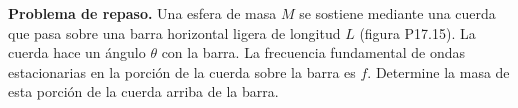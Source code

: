 \item \textbf{Problema de repaso.}
Una esfera de masa $M$ se sostiene mediante una cuerda que pasa sobre una barra horizontal ligera de longitud $L$ (figura P17.15). La cuerda hace un ángulo $\theta$ con la barra. La frecuencia fundamental de ondas estacionarias en la porción de la cuerda sobre la barra es $f$. Determine la masa de esta porción de la cuerda arriba de la barra.